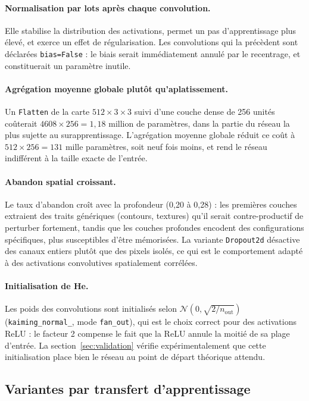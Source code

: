 \documentclass[11pt,a4paper]{article}
\newcommand{\code}[1]{\texttt{\small #1}}
\begin{document}
\paragraph{Normalisation par lots après chaque convolution.}
Elle stabilise la distribution des activations, permet un pas d'apprentissage
plus élevé, et exerce un effet de régularisation. Les convolutions qui la
précèdent sont déclarées \code{bias=False} : le biais serait immédiatement
annulé par le recentrage, et constituerait un paramètre inutile.

\paragraph{Agrégation moyenne globale plutôt qu'aplatissement.}
Un \code{Flatten} de la carte $512\times3\times3$ suivi d'une couche dense de
256 unités coûterait $4608 \times 256 = 1{,}18$ million de paramètres, dans la
partie du réseau la plus sujette au surapprentissage. L'agrégation moyenne
globale réduit ce coût à $512 \times 256 = 131$ mille paramètres, soit neuf fois
moins, et rend le réseau indifférent à la taille exacte de l'entrée.

\paragraph{Abandon spatial croissant.}
Le taux d'abandon croît avec la profondeur (0{,}20 à 0{,}28) : les premières
couches extraient des traits génériques (contours, textures) qu'il serait
contre-productif de perturber fortement, tandis que les couches profondes
encodent des configurations spécifiques, plus susceptibles d'être mémorisées.
La variante \code{Dropout2d} désactive des canaux entiers plutôt que des pixels
isolés, ce qui est le comportement adapté à des activations convolutives
spatialement corrélées.

\paragraph{Initialisation de He.}
\label{sec:init}
Les poids des convolutions sont initialisés selon
$\mathcal{N}(0, \sqrt{2/n_{\text{out}}})$ (\code{kaiming\_normal\_}, mode
\code{fan\_out}), qui est le choix correct pour des activations ReLU : le
facteur 2 compense le fait que la ReLU annule la moitié de sa plage d'entrée. La
section~\ref{sec:validation} vérifie expérimentalement que cette initialisation
place bien le réseau au point de départ théorique attendu.

\subsection{Variantes par transfert d'apprentissage}
\end{document}
